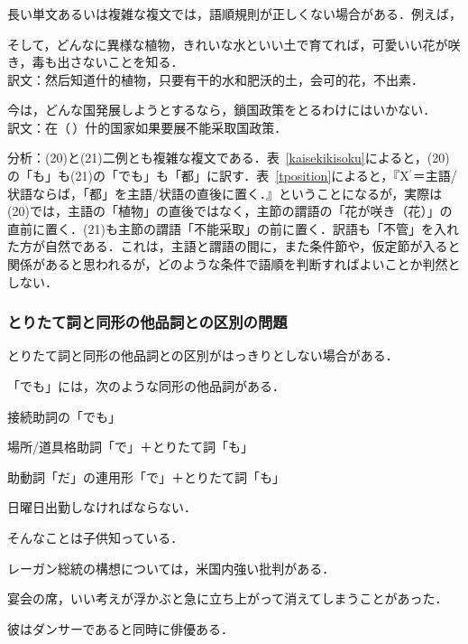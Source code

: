 \subsubsection{}
長い単文あるいは複雑な複文では，語順規則が正しくない場合がある．例えば，
\begin{enumerates}
 \setcounter{enumi}{19}
 \item そして，どんなに異様な植物，きれいな水といい土で育てれば，可愛いい花が咲き，毒も出さないことを知る． \\
       訳文：然后知道什的植物，只要有干的水和肥沃的土，会可的花，不出素．
 \item 今は，どんな国発展しようとするなら，鎖国政策をとるわけにはいかない． \\
       訳文：在（\,）什的国家如果要展不能采取国政策．
\end{enumerates}

分析：(20)と(21)二例とも複雑な複文である．表~\ref{kaisekikisoku}によると，(20)の「も」も(21)の「でも」も「都」に訳す．表~\ref{tposition}によると，『X$^{\prime}$＝主語/状語ならば，「都」を主語/状語の直後に置く．』ということになるが，実際は(20)では，主語の「植物」の直後ではなく，主節の謂語の「花が咲き（花）」の直前に置く．(21)も主節の謂語「不能采取」の前に置く．訳語も「不管」を入れた方が自然である．これは，主語と謂語の間に，また条件節や，仮定節が入ると関係があると思われるが，どのような条件で語順を判断すればよいことか判然としない．

\subsubsection{とりたて詞と同形の他品詞との区別の問題}
とりたて詞と同形の他品詞との区別がはっきりとしない場合がある．

「でも」には，次のような同形の他品詞がある．

\renewcommand{\theenumi}{}
\begin{enumerates}
 \item 接続助詞の「でも」
 \item 場所/道具格助詞「で」＋とりたて詞「も」
 \item 助動詞「だ」の連用形「で」＋とりたて詞「も」
\end{enumerates}
\vspace{1em}
\renewcommand{\theenumi}{}
\begin{enumerates}
 \setcounter{enumi}{21}
 \item 日曜日出勤しなければならない．
 \item そんなことは子供知っている．
 \item レーガン総統の構想については，米国内強い批判がある．
 \item 宴会の席，いい考えが浮かぶと急に立ち上がって消えてしまうことがあった．
 \item 彼はダンサーであると同時に俳優ある．
\end{enumerates}

